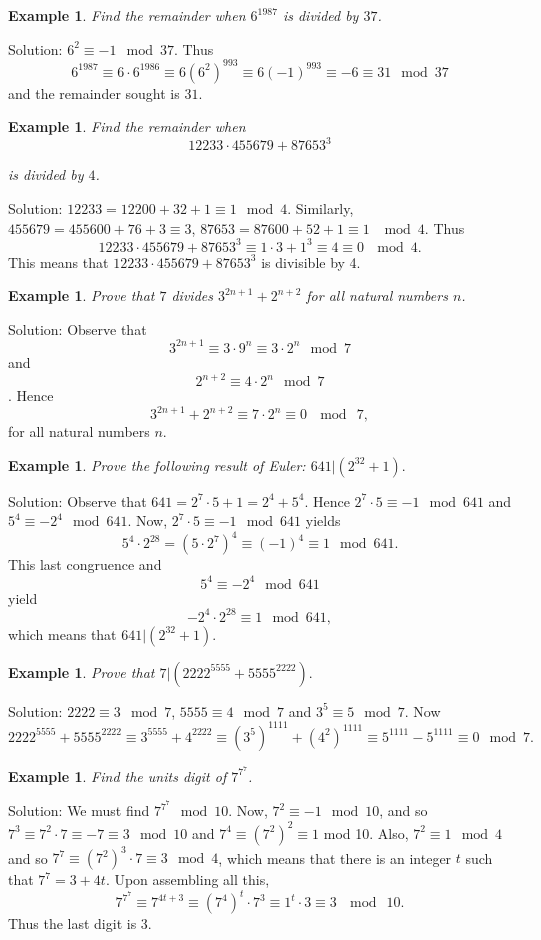 \documentclass[11pt, openany]{book}
\theoremstyle{change} \theoremheaderfont{\blue\sffamily\bfseries}
\newtheorem{exa}[thm]{Example}
\theoremstyle{nonumberplain} \theoremheaderfont{\sffamily\bfseries}
\newcommand{\í}{\'{\i}}
\begin{document}
\begin{exa} Find the remainder when $6^{1987}$ is divided by
$37$. \end{exa} Solution: $6^2 \equiv -1 \mod 37$. Thus $$6^{1987}
\equiv 6\cdot 6^{1986} \equiv 6(6^2 )^{993} \equiv 6(-1)^{993}
\equiv -6 \equiv 31  \mod 37$$ and the remainder sought is $31$.
\begin{exa} Find the remainder when
$$12233\cdot 455679 + 87653^3$$

is divided by $4$. \end{exa} Solution: $12233 = 12200 + 32 + 1
\equiv 1 \mod 4$. Similarly, $455679 = 455600 + 76 + 3 \equiv 3 $,
$87653 = 87600 + 52 + 1 \equiv 1$ $\mod 4$. Thus
$$12233\cdot 455679 + 87653^3 \equiv 1\cdot 3 + 1^3 \equiv 4 \equiv 0 \ \mod 4.$$This
means that $12233\cdot 455679 + 87653^3$ is divisible by 4.

\begin{exa} Prove that $7$ divides $3^{2n + 1} + 2^{n + 2}$ for all natural numbers $n$. \end{exa}
Solution: Observe that $$3^{2n + 1} \equiv 3\cdot 9^n \equiv
3\cdot 2^n \mod 7$$ and $$2^{n + 2} \equiv 4\cdot 2^n \mod 7$$.
Hence
$$ 3^{2n + 1} + 2^{n + 2} \equiv 7\cdot 2^n \equiv 0 \ \mod \ 7,$$for all
natural numbers $n.$
\begin{exa} Prove the following result of Euler: $641|(2^{32} + 1).$\end{exa}
Solution: Observe that $641 = 2^7\cdot 5 + 1 = 2^4 + 5^4.$ Hence
$2^7\cdot 5 \equiv -1 \mod 641$ and $5^4 \equiv -2^4 \mod 641$.
Now, $2^7\cdot 5 \equiv -1 \mod 641$ yields $$5^4 \cdot 2^{28} =
(5\cdot 2^7)^4 \equiv (-1)^4 \equiv 1 \mod 641.$$ This last
congruence and $$5^4 \equiv -2^4 \mod 641$$ yield $$-2^{4}\cdot
2^{28} \equiv 1\mod 641,$$ which means that $641|(2^{32} + 1).$
\begin{exa}Prove that $7|(2222^{5555} + 5555^{2222}).$\end{exa}
Solution: $2222 \equiv 3 \mod 7$, $5555 \equiv 4 \mod 7$ and $3^5
\equiv 5 \mod 7$. Now $$2222^{5555} + 5555^{2222} \equiv 3^{5555}
+ 4^{2222} \equiv (3^5)^{1111} + (4^2)^{1111} \equiv 5^{1111} -
5^{1111} \equiv 0 \mod 7.$$
\begin{exa} Find the units digit of $7^{7^7}$.\end{exa}
Solution: We must find $7^{7^7} \mod 10$. Now, $7^2 \equiv - 1
\mod 10$, and so $7^3 \equiv 7^2 \cdot 7 \equiv -7 \equiv 3 \mod
10$ and $7^4 \equiv (7^2)^2 \equiv 1$ mod 10. Also, $7^2 \equiv 1
\mod 4$ and so $7^7 \equiv (7^2)^3 \cdot 7 \equiv 3 \mod 4$, which
means that there is an integer $t$ such that $7^7 = 3 + 4t.$ Upon
assembling all this,
$$ 7^{7^7} \equiv 7^{4t + 3} \equiv (7^4)^t \cdot 7^3 \equiv 1^t\cdot 3
\equiv 3 \ \mod \ 10. $$Thus the last digit is 3.
\end{document}
